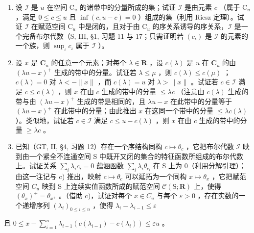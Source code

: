 \begin{enumerate}
\def\labelenumi{\alph{enumi})}
\setcounter{enumi}{1}
\item
  设 \(\mathcal{I}\) 是 \(u\) 在空间 \(\mathrm{C}_u\) 的诸带中的分量所成的集；试证 \(\mathcal{I}\) 是由元素 \(c\) （属于 \(\mathrm{C}_u\) ，满足 \(0 \leqslant c \leqslant u\) 且 \(\inf(c, u - c) = 0\) ）组成的集（利用 Riesz 定理）。试证 \(\mathcal{I}\) 在赋范空间 \(\mathrm{C}_u\) 中是闭的，且对于由 \(\mathrm{C}_u\) 的序关系诱导的序关系，\(\mathcal{I}\) 是一个完备布尔代数（S, III, §1, 习题 11 与 17；只需证明若 \((c_\iota)\) 是 \(\mathcal{I}\) 的元素的一个族，则 \(\sup_{\iota} c_\iota\) 属于 \(\mathcal{I}\) ）。
\item
  设 \(x\) 是 \(\mathbf{C}_u\) 的任意一个元素；对每个 \(\lambda \in \mathbf{R}\) ，设 \(c(\lambda)\) 是 \(u\) 在 \(\mathbf{C}_u\) 的由 \((\lambda u - x)^+\) 生成的带中的分量。试证若 \(\lambda \leqslant \mu\) ，则 \(c(\lambda) \leqslant c(\mu)\) ；\(c(\lambda) = 0\) 对 \(\lambda < -\|x\|\) ，而 \(c(\lambda) = u\) 对 \(\lambda > \|x\|\) 。试证若 \(c \in \mathcal{I}\) 满足 \(c \leqslant c(\lambda)\) ，则 \(x\) 在由 \(c\) 生成的带中的分量 \(\leqslant \lambda c\) （注意由 \(c(\lambda)\) 生成的带与由 \((\lambda u - x)^+\) 生成的带是相同的，且 \(\lambda u - x\) 在此带中的分量等于 \((\lambda u - x)^+\) 在此带中的分量；由此推出 \(x\) 在这同一个带中的分量 \(\leqslant \lambda c(\lambda)\) ）。类似地，试证若 \(c \in \mathcal{I}\) 满足 \(c \leqslant u - c(\lambda)\) ，则 \(x\) 在由 \(c\) 生成的带中的分量 \(\geqslant \lambda c\) 。
\item
  已知（GT, II, §4, 习题 12）存在一个序结构同构 \(c \mapsto \theta_c\) ，它把布尔代数 \(\mathcal{I}\) 映到由一个紧全不连通空间 S 中既开又闭的集合的特征函数所组成的布尔代数上。试证关系 \(\sum_{i} \lambda_i c_i = 0\) 蕴涵函数 \(\sum_{i} \lambda_i \theta_{c_i}\) 在 S 上为 0（利用分解引理）；由这一注记与 c) 推出，映射 \(c \mapsto \theta_{c}\) 可以延拓为一个同构 \(x \mapsto \theta_{x}\) ，它把赋范空间 \(C_{u}\) 映到 S 上连续实值函数所成的赋范空间 \(\mathcal{C}(\mathrm{S};\mathbf{R})\) 上，使得 \((\theta_{x})^{+} = \theta_{x^{+}}\) 。（借助 c)，试证对每个 \(x \in C_{u}\) 与每个 \(\varepsilon > 0\) ，存在实数的一个递增序列 \((\lambda_{i})_{0 \leqslant i \leqslant n}\) ，使得 \(\lambda_{i} - \lambda_{i-1} \leqslant \varepsilon\)
\end{enumerate}

且 \(0 \leqslant x - \sum_{i=1}^{n} \lambda_{i-1} (c(\lambda_{i-1}) - c(\lambda_i)) \leqslant \varepsilon u\) 。

